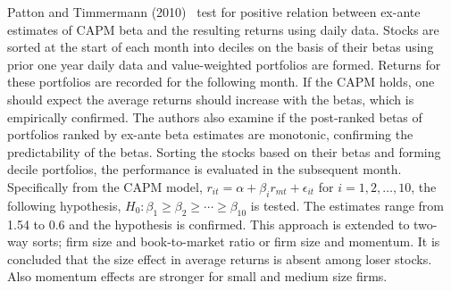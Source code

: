 Patton and Timmermann (2010)~\cite{pattim} test for positive relation between ex-ante estimates of CAPM beta and the resulting returns using daily data. Stocks are sorted at the start of each month into deciles on the basis of their betas using prior one year daily data and value-weighted portfolios are formed. Returns for these portfolios are recorded for the following month. If the CAPM holds, one should expect the average returns should increase with the betas, which is empirically confirmed. The authors also examine if the post-ranked betas of portfolios ranked by ex-ante beta estimates are monotonic, confirming the predictability of the betas. Sorting the stocks based on their betas and forming decile portfolios, the performance is evaluated in the subsequent month. Specifically from the CAPM model, $r_{it}= \alpha + \beta_i r_{mt} + \epsilon_{it}$ for $i= 1, 2, \ldots, 10$, the following hypothesis, $H_0: \beta_1 \geq \beta_2 \geq \cdots \geq \beta_{10}$ is tested. The estimates range from 1.54 to 0.6 and the hypothesis is confirmed. This approach is extended to two-way sorts; firm size and book-to-market ratio or firm size and momentum. It is concluded that the size effect in average returns is absent among loser stocks. Also momentum effects are stronger for small and medium size firms. \twomedskip


